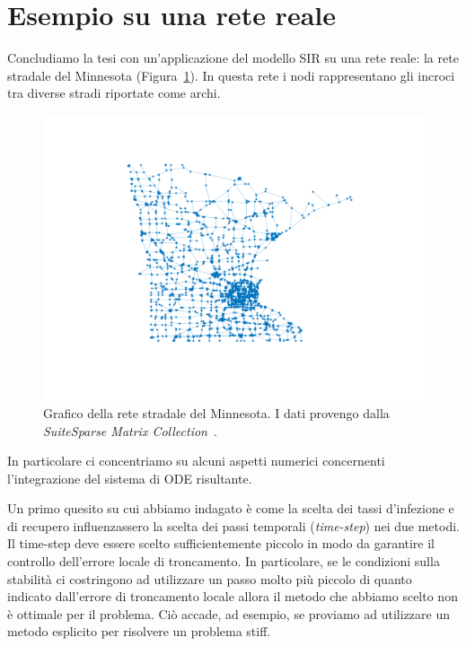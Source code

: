 \section{Esempio su una rete reale}
Concludiamo la tesi con un'applicazione del modello SIR su una rete reale:  la rete stradale del Minnesota (Figura~\ref{fig::minnesota}). In questa rete i nodi rappresentano gli incroci tra diverse stradi riportate come archi.
\begin{figure}[htb]
\centering
\includegraphics{Figure/minnesota}
\caption[Grafico della rete stradale del Minnesota.]{Grafico della rete stradale del Minnesota. I dati provengo dalla \emph{SuiteSparse Matrix Collection}~\cite{RepMatrici}.}\label{fig::minnesota}
\end{figure}
In particolare ci concentriamo su alcuni aspetti numerici concernenti l'integrazione del sistema di ODE risultante.

Un primo quesito su cui abbiamo indagato \`e come la scelta dei tassi d'infezione e di recupero influenzassero la scelta dei passi temporali (\emph{time-step}) nei due metodi. Il time-step deve essere scelto sufficientemente piccolo in modo da garantire il controllo dell'errore locale di troncamento.  In particolare, se le condizioni sulla stabilit\`a ci costringono ad utilizzare un passo molto pi\`u piccolo di quanto indicato dall'errore di troncamento locale allora il metodo che abbiamo scelto non \`e ottimale per il problema. Ci\`o accade, ad esempio, se proviamo ad utilizzare un metodo esplicito per risolvere un problema stiff.
	
